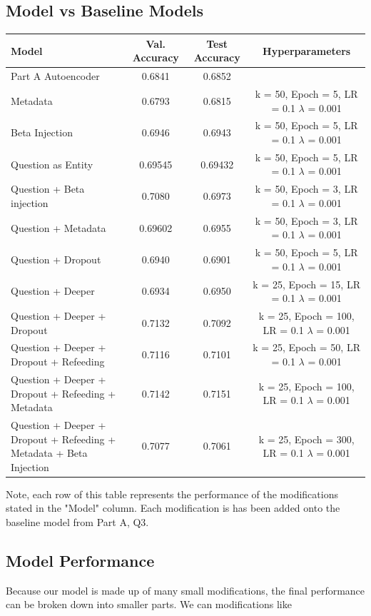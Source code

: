 \documentclass{article}
\begin{document}
\subsection{Model vs Baseline Models}
\begin{table}[htbp!]
\centering
\begin{tabular}{|m{5cm}|c|c|c|}
\hline
Model & Val. Accuracy & Test Accuracy & Hyperparameters \\
\hline
Part A Autoencoder & 0.6841 & 0.6852 & \\
\hline
Metadata & 0.6793 & 0.6815 & k = 50, Epoch = 5, LR = 0.1 $\lambda$ = 0.001\\
\hline
Beta Injection & 0.6946 & 0.6943 & k = 50, Epoch = 5, LR = 0.1 $\lambda$ = 0.001\\
\hline
Question as Entity & 0.69545 & 0.69432 & k = 50, Epoch = 5, LR = 0.1 $\lambda$ = 0.001\\
\hline
Question + Beta injection & 0.7080 & 0.6973 & k = 50, Epoch = 3, LR = 0.1 $\lambda$ = 0.001\\
\hline
Question + Metadata& 0.69602 & 0.6955 & k = 50, Epoch = 3, LR = 0.1 $\lambda$ = 0.001\\
\hline
Question + Dropout & 0.6940 & 0.6901 & k = 50, Epoch = 5, LR = 0.1 $\lambda$ = 0.001\\
\hline
Question + Deeper & 0.6934 & 0.6950 & k = 25, Epoch = 15, LR = 0.1 $\lambda$ = 0.001\\
\hline
Question + Deeper + Dropout & 0.7132 & 0.7092 & k = 25, Epoch = 100, LR = 0.1 $\lambda$ = 0.001\\
\hline
 Question + Deeper + Dropout + Refeeding& 0.7116 & 0.7101 & k = 25, Epoch = 50, LR = 0.1 $\lambda$ = 0.001\\
 \hline
Question + Deeper + Dropout + Refeeding + Metadata& 0.7142 & 0.7151 & k = 25, Epoch = 100, LR = 0.1 $\lambda$ = 0.001\\
 \hline
Question + Deeper + Dropout + Refeeding + Metadata + Beta Injection & 0.7077 & 0.7061 & k = 25, Epoch = 300, LR = 0.1 $\lambda$ = 0.001\\
 \hline
\end{tabular}
\end{table}
Note, each row of this table represents the performance of the modifications stated in the "Model" column. Each modification is has been added onto the baseline model from Part A, Q3.\\
\subsection{Model Performance}
Because our model is made up of many small modifications, the final performance can be broken down into smaller parts. We can modifications like 
\end{document}
